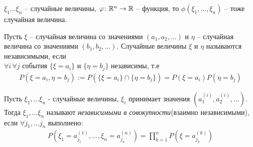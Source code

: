 \begin{remark}
	$\xi_1 \ldots \xi_n$ -- случайные величины, $\varphi\colon \mathbb{R}^n \to \mathbb{R}$ -- функция, 
	то $\phi(\xi_1, \ldots, \xi_n)$ -- тоже случайная величина.
\end{remark}

\begin{definition}
	Пусть $\xi$ -- случайная величина со значениями $(a_1, a_2, \ldots )$ и 
	$\eta$ -- случайная величина со значениями $(b_1, b_2, \ldots)$. 
	Случайные величины $\xi$ и $\eta$ называются независимыми, если\\
	$\forall i \, \forall j$ события $\{ \xi = a_i \}$ и  $\{ \eta = b_j \}$ независимы, т.е 
	\begin{align*}
		P(\xi = a_i, \eta = b_j) := P(\{ \xi = a_i \} \cap \{ \eta = b_j \}) = P(\xi = a_i) P(\eta = b_j)
	\end{align*}
\end{definition}

\begin{definition}
	Пусть $\xi_1, \ldots \xi_n$ - случайные величины, 
	$\xi_i$ принимает значения $(a_1^{(i)}, a_2^{(i)}, \ldots)$. 
	Тогда $\xi_1, \ldots \xi_n$ называют \emph{независимыми в совокупности}(взаимно независимыми), 
	если $\forall j_1, \ldots j_n$ выполнено:
	\begin{align*}
		P(\xi_1 = a_{j_1}^{(1)}, \ldots, \xi_n = a_{j_n}^{(n)}) = 
		\prod\limits_{k = 1}^n P(\xi = a_{j_k}^{(k)})
	\end{align*}
\end{definition}

